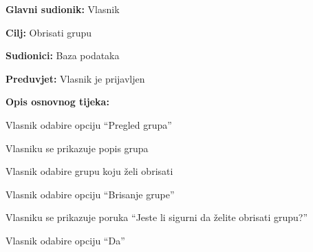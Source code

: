 			\noindent {}
			\begin{packed_item}
				\item \textbf{Glavni sudionik: } Vlasnik
				\item  \textbf{Cilj:} Obrisati grupu
				\item  \textbf{Sudionici:} Baza podataka
				\item  \textbf{Preduvjet:} Vlasnik je prijavljen
				\item  \textbf{Opis osnovnog tijeka:}
				\item[] \begin{packed_enum}
					\item Vlasnik odabire opciju “Pregled grupa”
					\item Vlasniku se prikazuje popis grupa
					\item Vlasnik odabire grupu koju želi obrisati
					\item Vlasnik odabire opciju “Brisanje grupe”
					\item Vlasniku se prikazuje poruka “Jeste li sigurni da želite obrisati grupu?”
					\item Vlasnik odabire opciju “Da”
				\end{packed_enum}
			\end{packed_item}
			
